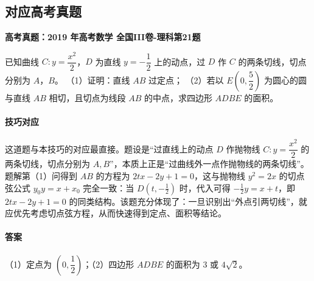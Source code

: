 \documentclass[UTF8,a4paper,11pt]{ctexart}
\newenvironment{gaokao}[1]{\par\medskip\noindent\textbf{高考真题：#1}\par\smallskip}{\par\medskip}
\begin{document}
\subsection*{对应高考真题}

\begin{gaokao}{2019 年高考数学 全国III卷-理科第21题}

已知曲线 $C: y=\dfrac{x^2}{2}$，$D$ 为直线 $y=-\dfrac{1}{2}$ 上的动点，过 $D$ 作 $C$ 的两条切线，切点分别为 $A$，$B$。
（1）证明：直线 $AB$ 过定点；
（2）若以 $E\left(0,\dfrac{5}{2}\right)$ 为圆心的圆与直线 $AB$ 相切，且切点为线段 $AB$ 的中点，求四边形 $ADBE$ 的面积。

\begin{center}


\end{center}

\paragraph{技巧对应}

这道题与本技巧的对应最直接。题设是“过直线上的动点 $D$ 作抛物线 $C:y=\dfrac{x^2}{2}$ 的两条切线，切点分别为 $A,B$”，本质上正是“过曲线外一点作抛物线的两条切线”。题解第（1）问得到 $AB$ 的方程为 $2tx-2y+1=0$，这与抛物线 $y^2=2x$ 的切点弦公式 $y_0y=x+x_0$ 完全一致：当 $D(t,-\tfrac12)$ 时，代入可得 $-\tfrac12 y=x+t$，即 $2tx-2y+1=0$ 的同类结构。该题充分体现了：一旦识别出“外点引两切线”，就应优先考虑切点弦方程，从而快速得到定点、面积等结论。

\paragraph{答案}

（1）定点为 $\left(0,\dfrac{1}{2}\right)$；（2）四边形 $ADBE$ 的面积为 $3$ 或 $4\sqrt{2}$。


\end{gaokao}
\end{document}
